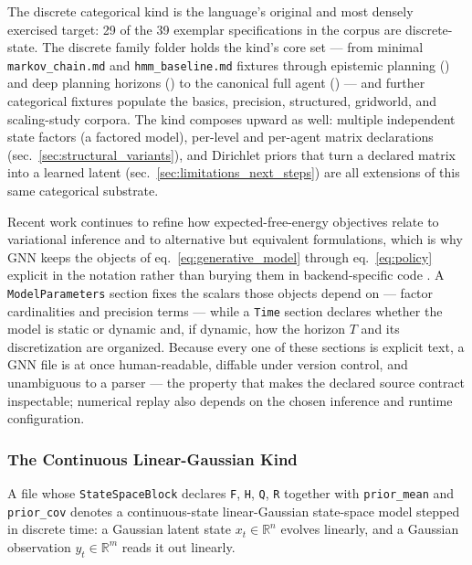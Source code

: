 \documentclass[
  english,
  9pt,
]{extarticle}
\begin{document}
The discrete categorical kind is the language's original and most
densely exercised target: 29 of the 39 exemplar specifications in the
corpus are discrete-state. The discrete family folder holds the kind's
core set --- from minimal \texttt{markov\_chain.md} and
\texttt{hmm\_baseline.md} fixtures through epistemic planning
() and deep planning horizons
() to the canonical full agent
() --- and further categorical fixtures
populate the basics, precision, structured, gridworld, and scaling-study
corpora. The kind composes upward as well: multiple independent state
factors (a factored model), per-level and per-agent matrix declarations
(sec.~\ref{sec:structural_variants}), and Dirichlet priors that turn a
declared matrix into a learned latent
(sec.~\ref{sec:limitations_next_steps}) are all extensions of this same
categorical substrate.

Recent work continues to refine how expected-free-energy objectives
relate to variational inference and to alternative but equivalent
formulations, which is why GNN keeps the objects of
eq.~\ref{eq:generative_model} through eq.~\ref{eq:policy} explicit in
the notation rather than burying them in backend-specific code
\citep{champion2024reframingEfe, nuijten2026typeInference, nuijten2026efePlanningVariational}.
A \texttt{ModelParameters} section fixes the scalars those objects
depend on --- factor cardinalities and precision terms --- while a
\texttt{Time} section declares whether the model is static or dynamic
and, if dynamic, how the horizon \(T\) and its discretization are
organized. Because every one of these sections is explicit text, a GNN
file is at once human-readable, diffable under version control, and
unambiguous to a parser --- the property that makes the declared source
contract inspectable; numerical replay also depends on the chosen
inference and runtime configuration.

\subsubsection{The Continuous Linear-Gaussian
Kind}\label{the-continuous-linear-gaussian-kind}

A file whose \texttt{StateSpaceBlock} declares \texttt{F}, \texttt{H},
\texttt{Q}, \texttt{R} together with \texttt{prior\_mean} and
\texttt{prior\_cov} denotes a continuous-state linear-Gaussian
state-space model stepped in discrete time: a Gaussian latent state
\(x_t \in \mathbb{R}^n\) evolves linearly, and a Gaussian observation
\(y_t \in \mathbb{R}^m\) reads it out linearly.
\end{document}
